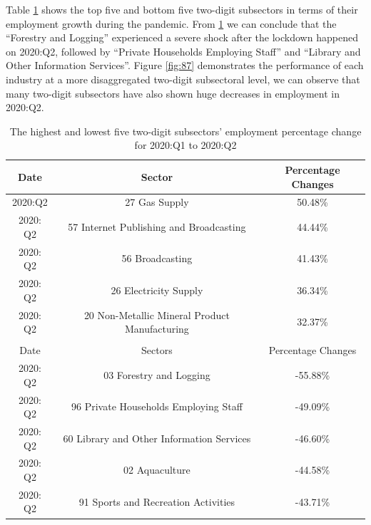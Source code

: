 \documentclass[11pt,a4paper,]{article}
\begin{document}
Table \ref{tab:comp} shows the top five and bottom five two-digit subsectors in terms of their employment growth during the pandemic. From \ref{tab:comp} we can conclude that the ``Forestry and Logging'' experienced a severe shock after the lockdown happened on 2020:Q2, followed by ``Private Households Employing Staff'' and ``Library and Other Information Services''. Figure \ref{fig:87} demonstrates the performance of each industry at a more disaggregated two-digit subsectoral level, we can observe that many two-digit subsectors have also shown huge decreases in employment in 2020:Q2.

\begin{table}
\begin{center}
\begin{tabular}{ccc}
\hline
Date     & Sector                                        & Percentage Changes \\
\hline
2020:Q2  & 27 Gas Supply                                 & 50.48\%                                \\
2020: Q2 & 57 Internet Publishing and Broadcasting       & 44.44\%                                \\
2020: Q2 & 56 Broadcasting                               & 41.43\%                                \\
2020: Q2 & 26 Electricity Supply                         & 36.34\%                                \\
2020: Q2 & 20 Non-Metallic Mineral Product Manufacturing & 32.37\% 
                 \\
                 \\
                 \hline
Date     &  Sectors                                      &Percentage Changes\\
                 \hline
2020: Q2 & 03 Forestry and Logging                   &-55.88\%  
                 \\
2020: Q2 & 96 Private Households Employing Staff     & -49.09\% 
                 \\
2020: Q2 & 60 Library and Other Information Services & -46.60\% 
                 \\
2020: Q2 & 02 Aquaculture                                & -44.58\%  
                 \\
2020: Q2 & 91 Sports and Recreation Activities           & -43.71\%
\end{tabular}
\end{center}
\caption{The highest and lowest five two-digit subsectors' employment percentage change for 2020:Q1 to 2020:Q2 }
\label{tab:comp}
\end{table}
\end{document}
